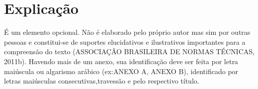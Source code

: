 \chapter{{\normalfont Explicação}}
\label{anexo: a}

É um elemento opcional. Não é elaborado pelo próprio autor mas sim por outras pessoas e constitui-se de suportes elucidativos e ilustrativos 
importantes para a compreensão do texto (ASSOCIAÇÃO BRASILEIRA DE NORMAS TÉCNICAS, 2011b). Havendo mais de um anexo, sua identificação deve 
ser feita por letra maiúscula ou algarismo arábico (ex:ANEXO A, ANEXO B), identificado por letras maiúsculas consecutivas,travessão e pelo 
respectivo título. 